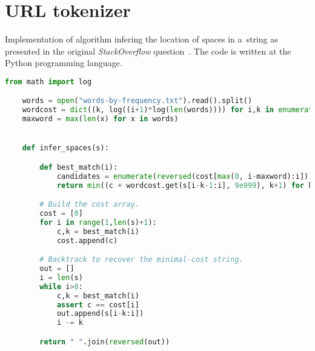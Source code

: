 

\lstset{style=mystyle}

\chapter{URL tokenizer}\label{ch:url-tokenizer}

Implementation of algorithm infering the location of spaces in a~string as presented in the original \textit{StackOverflow} question~\cite{stackoverflow:tokenizer}.
The code is written at the Python programming language.

\begin{lstlisting}[language=Python]
    from math import log

    words = open("words-by-frequency.txt").read().split()
    wordcost = dict((k, log((i+1)*log(len(words)))) for i,k in enumerate(words))
    maxword = max(len(x) for x in words)


    def infer_spaces(s):

        def best_match(i):
            candidates = enumerate(reversed(cost[max(0, i-maxword):i]))
            return min((c + wordcost.get(s[i-k-1:i], 9e999), k+1) for k,c in candidates)

        # Build the cost array.
        cost = [0]
        for i in range(1,len(s)+1):
            c,k = best_match(i)
            cost.append(c)

        # Backtrack to recover the minimal-cost string.
        out = []
        i = len(s)
        while i>0:
            c,k = best_match(i)
            assert c == cost[i]
            out.append(s[i-k:i])
            i -= k

        return " ".join(reversed(out))
\end{lstlisting}
